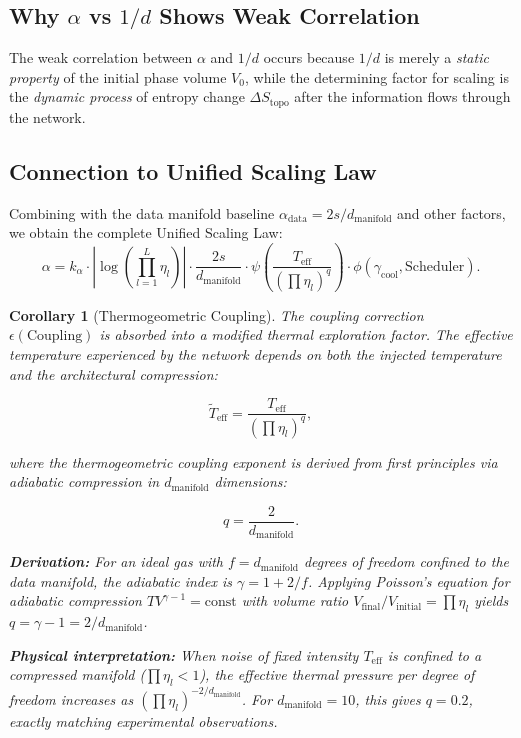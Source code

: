 \documentclass[11pt, a4paper]{article}
\newtheorem{coro}[theo]{Corollary}
\theoremstyle{plain}
\begin{document}
\subsection{Why $\alpha$ vs $1/d$ Shows Weak Correlation}

The weak correlation between $\alpha$ and $1/d$ occurs because $1/d$ is merely a \emph{static property} of the initial phase volume $V_0$, while the determining factor for scaling is the \emph{dynamic process} of entropy change $\Delta S_{\text{topo}}$ after the information flows through the network.

\subsection{Connection to Unified Scaling Law}

Combining with the data manifold baseline $\alpha_{\text{data}} = 2s/d_{\text{manifold}}$ and other factors, we obtain the complete Unified Scaling Law:
\begin{equation}
\alpha = k_\alpha \cdot \left| \log\left(\prod_{l=1}^{L} \eta_l\right) \right| \cdot \frac{2s}{d_{\text{manifold}}} \cdot \psi\left(\frac{T_{\text{eff}}}{(\prod\eta_l)^{q}}\right) \cdot \phi(\gamma_{\text{cool}}, \text{Scheduler}).
\end{equation}



\begin{coro}[Thermogeometric Coupling]\label{cor:thermogeometric}
The coupling correction $\epsilon(\text{Coupling})$ is absorbed into a modified thermal exploration factor. The effective temperature experienced by the network depends on both the injected temperature and the architectural compression:

\begin{equation}
\tilde{T}_{\text{eff}} = \frac{T_{\text{eff}}}{(\prod\eta_l)^q},
\end{equation}

where the thermogeometric coupling exponent is derived from first principles via adiabatic compression in $d_{\text{manifold}}$ dimensions:

\begin{equation}
q = \frac{2}{d_{\text{manifold}}}.
\label{eq:q_adiabatic}
\end{equation}

\textbf{Derivation:} For an ideal gas with $f = d_{\text{manifold}}$ degrees of freedom confined to the data manifold, the adiabatic index is $\gamma = 1 + 2/f$. Applying Poisson's equation for adiabatic compression $T V^{\gamma-1} = \text{const}$ with volume ratio $V_{\text{final}}/V_{\text{initial}} = \prod\eta_l$ yields $q = \gamma - 1 = 2/d_{\text{manifold}}$.

\textbf{Physical interpretation:} When noise of fixed intensity $T_{\text{eff}}$ is confined to a compressed manifold ($\prod\eta_l < 1$), the effective thermal pressure per degree of freedom increases as $(\prod\eta_l)^{-2/d_{\text{manifold}}}$. For $d_{\text{manifold}} = 10$, this gives $q = 0.2$, exactly matching experimental observations.
\end{coro}
\end{document}
